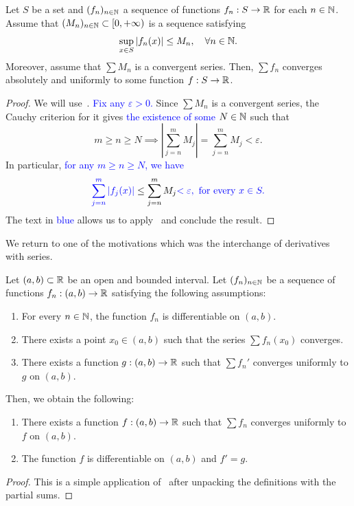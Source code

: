 \begin{thm}
	\label{thm:m_test}
	Let $S$ be a set and $(f_n)_{n\in\mathbb{N}}$ a sequence of functions $f_n:S\to \mathbb{R}$ for each $n\in\mathbb{N}$. Assume that $(M_n)_{n\in\mathbb{N}}\subset [0,+\infty)$ is a sequence satisfying
	\[
	\sup_{x\in S}|f_n(x)| \le M_n,\quad \forall n\in\mathbb{N}.
	\]
	Moreover, assume that $\sum M_n$ is a convergent series. Then, $\sum f_n$ converges absolutely and uniformly to some function $f:S\to \mathbb{R}$.
\end{thm}
\begin{proof}
	We will use~. \textcolor{blue}{Fix any $\varepsilon>0$.} Since $\sum M_n$ is a convergent series, the Cauchy criterion for it gives \textcolor{blue}{the existence of some $N\in\mathbb{N}$} such that
	\[
	m\ge n \ge N \implies \left|
	\sum_{j=n}^m M_j
	\right| = \sum_{j=n}^m M_j <\varepsilon.
	\]
	In particular, \textcolor{blue}{for any $m\ge n\ge N$, we have}
	\[
	\textcolor{blue}{ \sum_{j=n}^m |f_j(x)|} \le \sum_{j=n}^m M_j \textcolor{blue}{< \varepsilon, \text{ for every }x\in S.}
	\]
	The text in \textcolor{blue}{blue} allows us to apply~ and conclude the result.
\end{proof}
We return to one of the motivations which was the interchange of derivatives with series. 
\begin{thm}
	\label{thm:unif_cvg_series_diff}
	Let $(a,b)\subset \mathbb{R}$ be an open and bounded interval. Let $(f_n)_{n\in\mathbb{N}}$ be a sequence of functions $f_n:(a,b)\to \mathbb{R}$ satisfying the following assumptions:
	\begin{enumerate}
		\item For every $n\in\mathbb{N}$, the function $f_n$ is differentiable on $(a,b)$.
		\item There exists a point $x_0\in(a,b)$ such that the series $\sum f_n(x_0)$ converges.
		\item There exists a function $g:(a,b)\to \mathbb{R}$ such that $\sum f_n'$ converges uniformly to $g$ on $(a,b)$.
	\end{enumerate}
	Then, we obtain the following:
	\begin{enumerate}
		\item There exists a function $f:(a,b)\to \mathbb{R}$ such that $\sum f_n$ converges uniformly to $f$ on $(a,b)$.
		\item The function $f$ is differentiable on $(a,b)$ and $f' = g$.
	\end{enumerate}
\end{thm}
\begin{proof}
	This is a simple application of~ after unpacking the definitions with the partial sums.
\end{proof}